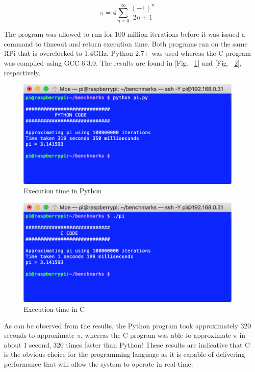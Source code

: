 \begin{equation}
	\pi=4\sum\limits_{n=0}^\infty \frac{(-1)^n}{2n+1}
    \label{eq:pi}
\end{equation}

The program was allowed to run for 100 million iterations before it was issued a command to timeout and return execution time. Both programs ran on the same RPi that is overclocked to 1.4GHz. Python 2.7+ was used whereas the C program was compiled using GCC 6.3.0. The results are found in [Fig. ~\ref{fig:py_pi}] and [Fig. ~\ref{fig:C_pi}], respectively.

\begin{figure}[H]
  \centering
  \includegraphics[width=.85\textwidth]{Controls/py_pi.png}
  \caption{\label{fig:py_pi}Execution time in Python}
\end{figure}

\begin{figure}[H]
  \centering
  \includegraphics[width=.85\textwidth]{Controls/C_pi.png}
  \caption{\label{fig:C_pi}Execution time in C}
\end{figure}

As can be observed from the results, the Python program took approximately 320 seconds to approximate $\pi$, whereas the C program was able to approximate $\pi$ in about 1 second, 320 times faster than Python! These results are indicative that C is the obvious choice for the programming language as it is capable of delivering performance that will allow the system to operate in real-time.

